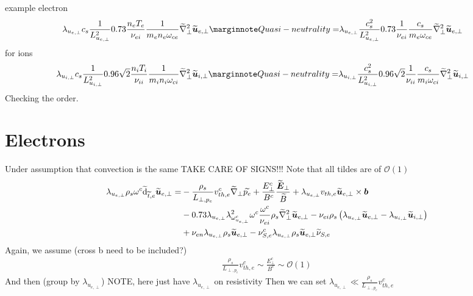 %
example electron
%
\begin{align*}
 \lambda_{u_{e,\perp}}c_s
\frac{1}{L_{u_{e,\perp}}^2}
0.73\frac{n_eT_e}{\nu_{ei}}
\frac{1}{m_e n_e \om_{ce}}
\wt{\grad}_\perp^2\wt{\ve{u}}_{e,\perp}
\note{Quasi-neutrality}
=&
 \lambda_{u_{e,\perp}}
\frac{c_s^2}{L_{u_{e,\perp}}^2}
0.73\frac{1}{\nu_{ei}}
\frac{c_s}{m_e\om_{ce}}
\wt{\grad}_\perp^2\wt{\ve{u}}_{e,\perp}
\end{align*}
%
for ions
%
\begin{align*}
 \lambda_{u_{i,\perp}}c_s
\frac{1}{L_{u_{i,\perp}}^2}
0.96\sqrt{2}\frac{n_iT_i}{\nu_{ii}}
\frac{1}{m_i n_i \om_{ci}}
\wt{\grad}_\perp^2\wt{\ve{u}}_{i,\perp}
\note{Quasi-neutrality}
=&
 \lambda_{u_{i,\perp}}
\frac{c_s^2}{L_{u_{i,\perp}}^2}
0.96\sqrt{2}\frac{1}{\nu_{ii}}
\frac{c_s}{m_i\om_{ci}}
\wt{\grad}_\perp^2\wt{\ve{u}}_{i,\perp}
\end{align*}
%
Checking the order.

\section{Electrons}
%
Under assumption that convection is the same
TAKE CARE OF SIGNS!!!
Note that all tildes are of $\mathcal{O}(1)$
%
\begin{align*}
 \lambda_{u_{e,\perp}}
 \rho_s
 \omega^c
 \widetilde{ \text{d}}_{\widetilde{ t},e} \widetilde{ \boldsymbol{u}}_{e,\perp}
 =&
 -
 \frac{\rho_s}{L_{\perp, p_e}}v^c_{th,e}
 \widetilde{ \nabla}_\perp \widetilde{ p_e}
 +
 \frac{E_\perp^c}{B^c}
 \frac{\widetilde{ \boldsymbol{E}}_\perp}{\widetilde{ B}}
 +
 \lambda_{u_{e,\perp}}
 v_{th,e}
 \widetilde{ \boldsymbol{u}}_{e,\perp}\times\boldsymbol{b}
 \\&
 -
0.73
 \lambda_{u_{e,\perp}}
\lambda_{\omega^c_{u_{e,\perp}}}^2
 \omega^c
\frac{\omega^c}{\nu_{ei} }
\rho_s
\widetilde{ \nabla}_\perp^2\widetilde{ \boldsymbol{u}}_{e,\perp}
-
\nu_{ei}
\rho_s
\left( \lambda_{u_{e,\perp}}\widetilde{ \boldsymbol{u}}_{e,\perp}-\lambda_{u_{i,\perp}}\widetilde{ \boldsymbol{u}}_{i,\perp}\right)
 \\&
 +
\nu_{e n}\lambda_{u_{e,\perp}}\rho_s\widetilde{ \boldsymbol{u}}_{e,\perp}
-
\nu^c_{S,e}\lambda_{u_{e,\perp}}\rho_s\widetilde{ \boldsymbol{u}}_{e,\perp} \widetilde{ \nu}_{S,e}
\end{align*}
%
Again, we assume (cross b need to be included?)
%
\begin{align*}
 \frac{\rho_s}{L_{\perp, p_e}}v^c_{th,e}
 \sim
 \frac{E_\perp^c}{B^c}
 \sim
 \mathcal{O}(1)
\end{align*}
%
And then (group by $\lambda_{u_{e,\perp}}$)
NOTE, here just have $\lambda_{u_{e,\perp}}$ on resistivity
Then we can set
$\lambda_{u_{e,\perp}} \ll \frac{\rho_s}{L_{\perp, p_e}}v^c_{th,e}$

